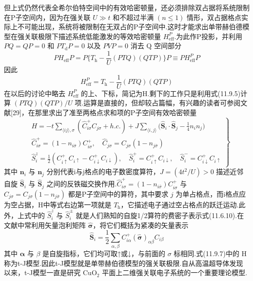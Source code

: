 但上式仍然代表全希尔伯特空间中的有效哈密顿量，还必须排除双占据将系统限制在P子空间内，因为在强关联 $U\gg t$ 和不超过半满 $(n\leqslant 1)$ 情形，双占据格点实际上不可能出现，系统将被限制在无双占的P子空间中.这时才能求出单带赫伯德模型在强关联极限下描述系统低能激发的等效哈密顿量 $H_{\mathrm{eff}}^{P}$.为此作P投影，并利用 $PQ=QP=0$ 和 $PT_{\mathrm{d}}P=0$ 以及 $PVP=0$ 消去 Q 空间部分
\begin{equation}
  PH_{\mathrm{eff}}P=P\biggl\{T_{\mathrm{h}}-\frac{1}{U}(PTQ)(QTP)\biggr\}P\equiv PH_{\mathrm{eff}}^{P}P
\end{equation}
因此
\begin{equation}
  H_{\mathrm{eff}}^{P}=T_{\mathrm{h}}-\frac{1}{U}(PTQ)(QTP)
\end{equation}
在以后的讨论中略去 $H_{\mathrm{eff}}^{P}$ 的上、下标，简记为H.剩下的工作只是利用式(11.9.5)计算 $(PTQ)(QTP)/U$ 项.运算是直接的，但却较占篇幅，有兴趣的读者可参阅文献[29]，在那里求出了准至两格点求和项的P子空间有效哈密顿量
\begin{equation}
\left.\begin{aligned}
  &H=-t\sum_{\langle ij\rangle,\sigma}(\hat{C}_{i\sigma}^{+}\hat{C}_{j\sigma}+h.c.)
  +J\sum_{\langle i,j\rangle}\biggl(\hat{\boldsymbol{S}}_{i}\cdot\hat{\boldsymbol{S}}_{j}
  -\frac{1}{4}n_{i}n_{j}\biggr)\\
  &\hat{C}_{i\sigma}^{+}=(1-n_{i\overline{\sigma}})C_{i\sigma}^{+},\quad
   \hat{C}_{j\sigma}=C_{j\sigma}(1-n_{j\overline{\sigma}})\\
  &\hat{S}_{i}^{z}=\frac{1}{2}(C_{i\uparrow}^{+}C_{i\uparrow}-C_{i\downarrow}^{+}C_{i\downarrow}),\quad
   \hat{S}_{i}^{+}=C_{i\uparrow}^{+}C_{i\downarrow},\quad
   \hat{S}_{i}^{-}=C_{i\downarrow}^{+}C_{i\uparrow}
\end{aligned}\right\}
\end{equation}
其中 $\boldsymbol{n}_{i}$ 与 $\boldsymbol{n}_{j}$ 分别代表i与j格点的电子数密度算符，$J=(4t^{2}/U)>0$ 描述近邻自旋 $\hat{\boldsymbol{S}}_{i}$ 与 $\hat{\boldsymbol{S}}_{j}$ 之间的反铁磁交换作用.$\hat{C}_{i\sigma}^{+}=(1-n_{i\overline{\sigma}})C_{i\sigma}^{+}$ 与 $\hat{C}_{j\sigma}=C_{j\sigma}(1-n_{j\overline{\sigma}})$ 都是P子空间中的算符，其中要求 $j$ 为单占格点，而i格点应为空占据，H中等式右边第一项就是 $T_{\mathrm{h}}$，它描述电子通过空占格点的跃迁运动.此外，上式中的 $\hat{S}_{i}^{z}$ 与 $\hat{S}_{i}^{\pm}$ 就是人们熟知的自旋1/2算符的费密子表示式(11.6.10).在文献中常利用矢量泡利矩阵 $\hat{\boldsymbol{\sigma}}$，将它们概括为紧凑的矢量表示
\begin{equation}
  \hat{\boldsymbol{S}}_{i}=\frac{1}{2}\sum_{\alpha,\beta}C_{i\alpha}^{+}(\hat{\boldsymbol{\sigma}})_{\alpha\beta}C_{i\beta}
\end{equation}
其中 $\boldsymbol{\alpha}$ 与 $\beta$ 是自旋指标，它们均可取↑或↓，与前面的 $\sigma$ 标相同.式(11.9.7)中的 H 称为t-J模型.因此t-J模型就是单带赫伯德模型的强关联极限.自从高温超导体发现以来，t-J模型一直是研究 $\mathrm{CuO_{2}}$ 平面上二维强关联电子系统的一个重要理论模型.

